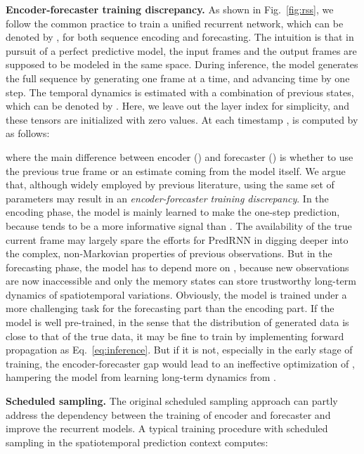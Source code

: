 \documentclass[10pt,journal,compsoc]{IEEEtran}
\newcommand{\eqn}[1]{Eq.~\eqref{#1}}
\newcommand{\fig}[1]{Fig.~\ref{#1}}
\newcommand{\myparagraph}[1]{\vspace{5pt} \noindent \textbf{#1.}}
\begin{document}
\myparagraph{Encoder-forecaster training discrepancy}
As shown in \fig{fig:rss}, we follow the common practice \cite{Finn2016Unsupervised,denton2018stochastic} to train a unified recurrent network, which can be denoted by , for both sequence encoding and forecasting. 
The intuition is that in pursuit of a perfect predictive model, the input frames  and the output frames  are supposed to be modeled in the same space.
During inference, the model generates the full sequence by generating one frame at a time, and advancing time by one step. The temporal dynamics is estimated with a combination of previous states, which can be denoted by . Here, we leave out the layer index for simplicity, and these tensors are initialized with zero values.
At each timestamp ,  is computed by  as follows:

where the main difference between encoder () and forecaster () is whether to use the previous true frame  or an estimate  coming from the model itself. 
We argue that, although widely employed by previous literature, using the same set of parameters  may result in an \textit{encoder-forecaster training discrepancy}.
In the encoding phase, the model is mainly learned to make the one-step prediction, because  tends to be a more informative signal than . The availability of the true current frame may largely spare the efforts for PredRNN in digging deeper into the complex, non-Markovian properties of previous observations. 
But in the forecasting phase, the model has to depend more on , because new observations are now inaccessible and only the memory states can store trustworthy long-term dynamics of spatiotemporal variations. 
Obviously, the model is trained under a more challenging task for the forecasting part than the encoding part.
If the model is well pre-trained, in the sense that the distribution of generated data is close to that of the true data, it may be fine to train  by implementing forward propagation as \eqn{eq:inference}.
But if it is not, especially in the early stage of training, the encoder-forecaster gap would lead to an ineffective optimization of , hampering the model from learning long-term dynamics from .


\myparagraph{Scheduled sampling}
The original scheduled sampling approach \cite{bengio2015scheduled} can partly address the dependency between the training of encoder and forecaster and improve the recurrent models. A typical training procedure with scheduled sampling in the spatiotemporal prediction context \cite{Finn2016Unsupervised} computes:
\end{document}
